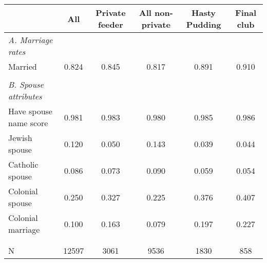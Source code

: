 \begin{tabular}{l*{5}{c}}
\toprule
& All& Private feeder& All non-private& Hasty Pudding& Final club\\
\midrule
\emph{A. Marriage rates}\\
Married& 0.824& 0.845& 0.817& 0.891& 0.910\\
\\[-1.0em]
\emph{B. Spouse attributes}\\
Have spouse name score& 0.981& 0.983& 0.980& 0.985& 0.986\\
Jewish spouse& 0.120& 0.050& 0.143& 0.039& 0.044\\
Catholic spouse& 0.086& 0.073& 0.090& 0.059& 0.054\\
Colonial spouse& 0.250& 0.327& 0.225& 0.376& 0.407\\
Colonial marriage& 0.100& 0.163& 0.079& 0.197& 0.227\\
\\[-1.0em]
\\
N	&    12597	&     3061	&     9536	&     1830	&      858\\
\bottomrule
\end{tabular}
